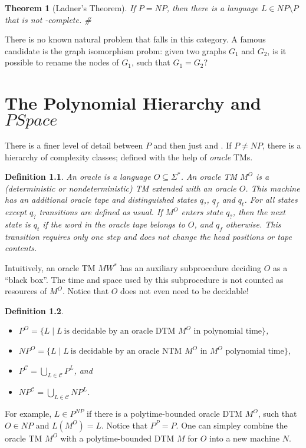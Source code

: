 \documentclass{report}
\newcommand{\NP}{\text{$\mathit{NP}$}\xspace}
\newcommand{\coNP}{\text{$\mathit{coNP}$}\xspace}
\newcommand{\Po}{\text{$\mathit{P}$}\xspace}
\newcommand{\PSpace}{\text{$\mathit{PSpace}$}\xspace}
\newtheorem{definition}{Definition}[chapter]
\newtheorem{theorem}[definition]{Theorem}
\begin{document}
\begin{theorem}[Ladner's Theorem]If $\Po=\NP$, then there is a language $L\in\NP\setminus\Po$ that is not \NP-complete. \#
\end{theorem}
There is no known natural problem that falls in this category. A famous candidate is the graph isomorphism probm: given two graphs $G_1$ and $G_2$, is it possible to rename the nodes of $G_1$, such that $G_1=G_2$?

\chapter{The Polynomial Hierarchy and $PSpace$}\label{sec:polynomial-hierarchy}

There is a finer level of detail between $\Po$ and \PSpace then just \NP and \coNP. If $\Po \neq \NP$, there is a hierarchy of complexity classes; defined with the help of \emph{oracle} TMs. 

\begin{definition} An \emph{oracle} is a language $O \subseteq \Sigma^*$. An \emph{oracle TM $M^O$} is a (deterministic or nondeterministic) TM extended with an oracle $O$. This machine has an additional \emph{oracle tape} and distinguished states $q_?$, $q_f$ and $q_t$. For all states except $q_?$ transitions are defined as usual. If $M^O$ enters state $q_?$, then the next state is $q_t$ if the word in the oracle tape belongs to $O$, and $q_f$ otherwise. This transition requires only one step and does not change the head positions or tape contents. 
\end{definition}
Intuitively, an oracle TM $MW^*$ has an auxiliary subprocedure deciding $O$ as a ``black box''. The time and space used by this subprocedure is not counted as resources of $M^O$. Notice that $O$ does not even need to be decidable!

\begin{definition} \mbox{}
\begin{itemize}
 \item $\Po^O = \{ L \mid L~\text{is decidable by an oracle DTM $M^O$ in polynomial time}\}$,
 \item $\NP^O = \{ L \mid L~\text{is decidable by an oracle NTM $M^O$ in $M^O$ polynomial time}\}$,
 \item $\Po^{\mathcal{C}} = \bigcup_{L \in \mathcal{C}} \Po^L$, and 
 \item $\NP^{\mathcal{C}} = \bigcup_{L \in \mathcal{C}} \NP^L$. 
\end{itemize}
\end{definition}
For example, $L \in \Po^\NP$ if there is a polytime-bounded oracle DTM $M^O$, such that $O \in \NP$ and $L(M^O) = L$. Notice that $\Po^\Po = P$. One can simpley combine the oracle TM $M^O$ with a polytime-bounded DTM $M$ for $O$ into a new machine $N$. 
\end{document}
